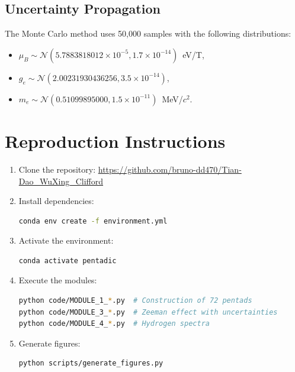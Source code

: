 \documentclass[11pt,a4paper]{article}
\theoremstyle{plain}
\theoremstyle{definition}
\theoremstyle{remark}
\begin{document}
\subsection{Uncertainty Propagation}

The Monte Carlo method uses 50,000 samples with the following distributions:
\begin{itemize}
  \item $\mu_B \sim \mathcal{N}(5.7883818012\times10^{-5}, 1.7\times10^{-14})$~eV/T,
  \item $g_e \sim \mathcal{N}(2.00231930436256, 3.5\times10^{-14})$,
  \item $m_e \sim \mathcal{N}(0.51099895000, 1.5\times10^{-11})$~MeV/$c^2$.
\end{itemize}

\section{Reproduction Instructions}
\label{sec:reproduction}

\begin{enumerate}
  \item Clone the repository:
    \url{https://github.com/bruno-dd470/Tian-Dao\_WuXing\_Clifford}
  
  \item Install dependencies:
    \begin{lstlisting}[language=bash]
conda env create -f environment.yml
    \end{lstlisting}
  
  \item Activate the environment:
    \begin{lstlisting}[language=bash]
conda activate pentadic
    \end{lstlisting}
  
  \item Execute the modules:
    \begin{lstlisting}[language=bash]
python code/MODULE_1_*.py  # Construction of 72 pentads
python code/MODULE_3_*.py  # Zeeman effect with uncertainties
python code/MODULE_4_*.py  # Hydrogen spectra
    \end{lstlisting}
  
  \item Generate figures:
    \begin{lstlisting}[language=bash]
python scripts/generate_figures.py
    \end{lstlisting}
\end{enumerate}
\end{document}
